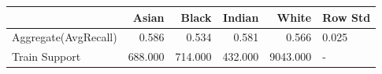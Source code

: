 \begin{center}
\begin{tabular}{lrrrrl}
\toprule
 & Asian & Black & Indian & White & Row Std \\
\midrule
Aggregate(AvgRecall) & 0.586 & 0.534 & 0.581 & 0.566 & 0.025 \\
Train Support & 688.000 & 714.000 & 432.000 & 9043.000 & - \\
\bottomrule
\end{tabular}
\end{center}
